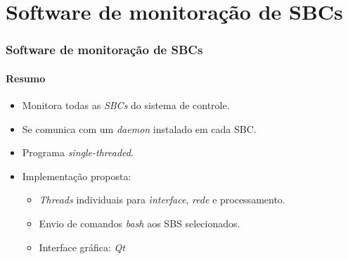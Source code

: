 \section{Software de monitoração de SBCs}

\begin{frame}
\frametitle{Software de monitoração de SBCs}
\framesubtitle{Resumo}

\begin{itemize}
  \item Monitora todas as \textit{SBCs} do sistema de controle.
  \vspace{12pt}
  \item	Se comunica com um \textit{daemon} instalado em cada SBC.
  \vspace{12pt}
  \item Programa \textit{single-threaded}.
  \vspace{12pt}
  \item Implementação proposta:
  \begin{itemize}
    \item \textit{Threads} individuais para \textit{ìnterface}, \textit{rede} e
    processamento.
    \item Envio de comandos \textit{bash} aos SBS selecionados.
    \item Interface gráfica: \textit{Qt}
  \end{itemize}
\end{itemize}

\end{frame}